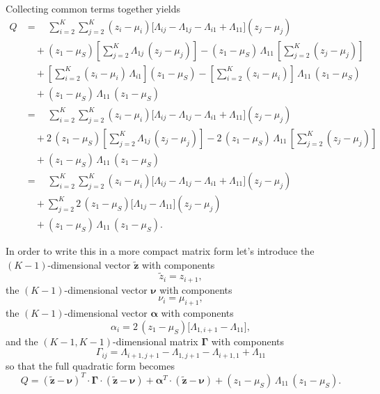 \documentclass[
  letterpaper,
  DIV=11,
  numbers=noendperiod]{scrartcl}
\begin{document}
Collecting common terms together yields \begin{align*}
Q
&=\quad
\sum_{i = 2}^{K} \sum_{j = 2}^{K} (z_{i} - \mu_{i})
\bigg[ \Lambda_{ij} - \Lambda_{1j} - \Lambda_{i1} + \Lambda_{11} \bigg]
(z_{j} - \mu_{j})
\\
&\quad
+ (z_{1} - \mu_{S})
  \left[ \sum_{j = 2}^{K} \Lambda_{1j} \, (z_{j} - \mu_{j}) \right]
- (z_{1} - \mu_{S}) \, \Lambda_{11} \,
  \left[ \sum_{j = 2}^{K} (z_{j} - \mu_{j}) \right]
\\
&\quad
+ \left[ \sum_{i = 2}^{K} (z_{i} - \mu_{i}) \, \Lambda_{i1} \right]
  (z_{1} - \mu_{S})
- \left[ \sum_{i = 2}^{K} (z_{i} - \mu_{i}) \right] \, \Lambda_{11} \,
  (z_{1} - \mu_{S})
\\
&\quad
+ (z_{1} - \mu_{S}) \, \Lambda_{11} \, (z_{1} - \mu_{S})
\\
&=\quad
\sum_{i = 2}^{K} \sum_{j = 2}^{K} (z_{i} - \mu_{i})
\bigg[ \Lambda_{ij} - \Lambda_{1j} - \Lambda_{i1} + \Lambda_{11} \bigg]
(z_{j} - \mu_{j})
\\
&\quad
+ 2 \, (z_{1} - \mu_{S})
  \left[ \sum_{j = 2}^{K} \Lambda_{1j} \, (z_{j} - \mu_{j}) \right]
- 2 \, (z_{1} - \mu_{S}) \, \Lambda_{11} \,
  \left[ \sum_{j = 2}^{K} (z_{j} - \mu_{j}) \right]
\\
&\quad
+ (z_{1} - \mu_{S}) \, \Lambda_{11} \, (z_{1} - \mu_{S})
\\
&=\quad
\sum_{i = 2}^{K} \sum_{j = 2}^{K} (z_{i} - \mu_{i})
\bigg[ \Lambda_{ij} - \Lambda_{1j} - \Lambda_{i1} + \Lambda_{11} \bigg]
(z_{j} - \mu_{j})
\\
&\quad+
\sum_{j = 2}^{K}
2 \, (z_{1} - \mu_{S}) \bigg[ \Lambda_{1j} - \Lambda_{11} \bigg]
(z_{j} - \mu_{j})
\\
&\quad
+ (z_{1} - \mu_{S}) \, \Lambda_{11} \, (z_{1} - \mu_{S}).
\end{align*}

In order to write this in a more compact matrix form let's introduce the
\((K - 1)\)-dimensional vector \(\mathbf{\tilde{z}}\) with components \[
\tilde{z}_{i} = z_{i + 1},
\] the \((K - 1)\)-dimensional vector \(\boldsymbol{\nu}\) with
components \[
\nu_{i} = \mu_{i + 1},
\] the \((K - 1)\)-dimensional vector \(\boldsymbol{\alpha}\) with
components \[
\alpha_{i}
=
2 \, (z_{1} - \mu_{S}) \bigg[ \Lambda_{1,i + 1} - \Lambda_{11} \bigg],
\] and the \((K - 1, K - 1)\)-dimensional matrix \(\boldsymbol{\Gamma}\)
with components \[
\Gamma_{ij}
=
\Lambda_{i + 1,j + 1} - \Lambda_{1,j + 1} - \Lambda_{i + 1,1} + \Lambda_{11}
\] so that the full quadratic form becomes \[
Q =
(\mathbf{\tilde{z}} - \boldsymbol{\nu})^{T} \cdot \boldsymbol{\Gamma} \cdot
(\mathbf{\tilde{z}} - \boldsymbol{\nu})
+ \boldsymbol{\alpha}^{T} \cdot (\mathbf{\tilde{z}} - \boldsymbol{\nu})
+ (z_{1} - \mu_{S}) \, \Lambda_{11} \, (z_{1} - \mu_{S}).
\]
\end{document}
